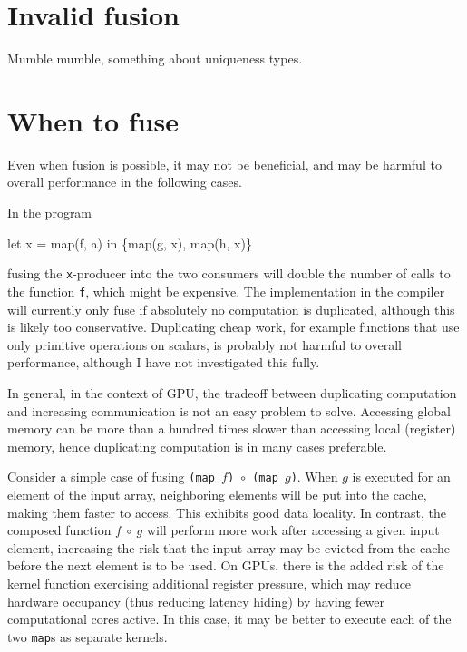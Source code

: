 \section{Invalid fusion}
\label{sec:invalidfusion}

Mumble mumble, something about uniqueness types.

\section{When to fuse}
\label{sec:whentofuse}

Even when fusion is possible, it may not be beneficial, and may be
harmful to overall performance in the following cases.

\begin{description}[style=nextline]
\item[Computation may be duplicated.]

In the program
\begin{colorcode}
let x = map(f, a) in
\{map(g, x), map(h, x)\}
\end{colorcode}
fusing the \texttt{x}-producer into the two consumers will double the
number of calls to the function \texttt{f}, which might be expensive.
The implementation in the \LO{} compiler will currently only fuse if
absolutely no computation is duplicated, although this is likely too
conservative.  Duplicating cheap work, for example functions that use
only primitive operations on scalars, is probably not harmful to
overall performance, although I have not investigated this
fully.

In general, in the context of GPU, the tradeoff between duplicating
computation and increasing communication is not an easy problem to
solve.  Accessing global memory can be more than a hundred times
slower than accessing local (register) memory, hence duplicating
computation is in many cases preferable.

\item[Can reduce memory locality.]

  Consider a simple case of fusing
  \texttt{(map~$f$)~$\circ$~(map~$g$)}.  When $g$ is executed for an
  element of the input array, neighboring elements will be put into
  the cache, making them faster to access.  This exhibits good data
  locality.  In contrast, the composed function $f~\circ~g$ will
  perform more work after accessing a given input element, increasing
  the risk that the input array may be evicted from the cache before
  the next element is to be used.  On GPUs, there is the added risk of
  the kernel function exercising additional register pressure, which
  may reduce hardware occupancy (thus reducing latency hiding) by
  having fewer computational cores active.  In this case, it may be
  better to execute each of the two \texttt{map}s as separate kernels.


\end{description}
